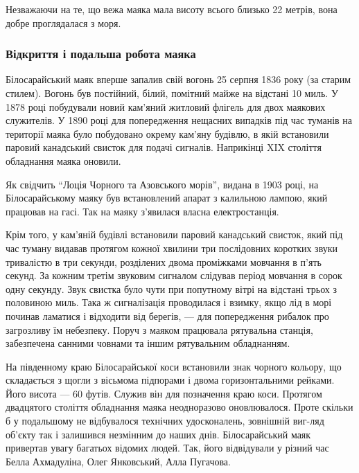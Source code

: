 Незважаючи на те, що вежа маяка мала висоту всього близько 22 метрів, вона
добре проглядалася з моря.


\subsubsection{Відкриття і подальша робота маяка}

Білосарайський маяк вперше запалив свій вогонь 25 серпня 1836 року (за старим
стилем). Вогонь був постійний, білий, помітний майже на відстані 10 миль. У
1878 році побудували новий кам'яний житловий флігель для двох маякових
служителів. У 1890 році для попередження нещасних випадків під час туманів на
території маяка було побудовано окрему кам'яну будівлю, в якій встановили
паровий канадський свисток для подачі сигналів. Наприкінці XIX століття
обладнання маяка оновили.

Як свідчить \enquote{Лоція Чорного та Азовського морів}, видана в 1903 році, на
Білосарайському маяку був встановлений апарат з калильною лампою, який працював
на гасі. Так на маяку з'явилася власна електростанція.

Крім того, у кам'яній будівлі встановили паровий канадський свисток, який під
час туману видавав протягом кожної хвилини три послідовних коротких звуки
тривалістю в три секунди, розділених двома проміжками мовчання в п'ять секунд.
За кожним третім звуковим сигналом слідував період мовчання в сорок одну
секунду. Звук свистка було чути при попутному вітрі на відстані трьох з
половиною миль. Така ж сигналізація проводилася і взимку, якщо лід в морі
починав ламатися і відходити від берегів, — для попередження рибалок про
загрозливу їм небезпеку. Поруч з маяком працювала рятувальна станція,
забезпечена санними човнами та іншим рятувальним обладнанням.

На південному краю Білосарайської коси встановили знак чорного кольору, що
складається з щогли з вісьмома підпорами і двома горизонтальними рейками. Його
висота — 60 футів. Служив він для позначення краю коси. Протягом двадцятого
століття обладнання маяка неодноразово оновлювалося. Проте скільки б у
подальшому не відбувалося технічних удосконалень, зовнішній виг\hyp{}ляд об'єкту так
і залишився незмінним до наших днів. Білосарайський маяк привертав увагу
багатьох відомих людей. Так, його відвідували у різний час Белла Ахмадуліна,
Олег Янковський, Алла Пугачова.

